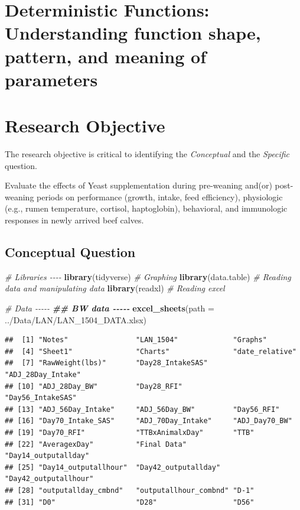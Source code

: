 \documentclass[
]{book}
\newenvironment{Shaded}{\begin{snugshade}}{\end{snugshade}}
\newcommand{\AttributeTok}[1]{\textcolor[rgb]{0.13,0.29,0.53}{#1}}
\newcommand{\CommentTok}[1]{\textcolor[rgb]{0.56,0.35,0.01}{\textit{#1}}}
\newcommand{\DocumentationTok}[1]{\textcolor[rgb]{0.56,0.35,0.01}{\textbf{\textit{#1}}}}
\newcommand{\FunctionTok}[1]{\textcolor[rgb]{0.13,0.29,0.53}{\textbf{#1}}}
\newcommand{\NormalTok}[1]{#1}
\newcommand{\StringTok}[1]{\textcolor[rgb]{0.31,0.60,0.02}{#1}}
\begin{document}
\chapter{Deterministic Functions: Understanding function shape, pattern, and meaning of parameters}\label{deterministic-functions-understanding-function-shape-pattern-and-meaning-of-parameters}

\chapter{Research Objective}\label{research-objective}

The research objective is critical to identifying the \emph{Conceptual} and the \emph{Specific} question.

Evaluate the effects of Yeast supplementation during pre-weaning and(or) post-weaning periods on performance (growth, intake, feed efficiency), physiologic (e.g., rumen temperature, cortisol, haptoglobin), behavioral, and immunologic responses in newly arrived beef calves.

\section{Conceptual Question}\label{conceptual-question}

\begin{Shaded}
\begin{Highlighting}[]
\CommentTok{\# Libraries {-}{-}{-}{-}}
\FunctionTok{library}\NormalTok{(tidyverse) }\CommentTok{\# Graphing }
\FunctionTok{library}\NormalTok{(data.table) }\CommentTok{\# Reading data and manipulating data}
\FunctionTok{library}\NormalTok{(readxl) }\CommentTok{\# Reading excel}

\CommentTok{\# Data {-}{-}{-}{-}{-}}
\DocumentationTok{\#\# BW data {-}{-}{-}{-}{-}}
\FunctionTok{excel\_sheets}\NormalTok{(}\AttributeTok{path =} \StringTok{\textquotesingle{}../Data/LAN/LAN\_1504\_DATA.xlsx\textquotesingle{}}\NormalTok{)}
\end{Highlighting}
\end{Shaded}

\begin{verbatim}
##  [1] "Notes"                "LAN_1504"             "Graphs"              
##  [4] "Sheet1"               "Charts"               "date_relative"       
##  [7] "RawWeight(lbs)"       "Day28_IntakeSAS"      "ADJ_28Day_Intake"    
## [10] "ADJ_28Day_BW"         "Day28_RFI"            "Day56_IntakeSAS"     
## [13] "ADJ_56Day_Intake"     "ADJ_56Day_BW"         "Day56_RFI"           
## [16] "Day70_Intake_SAS"     "ADJ_70Day_Intake"     "ADJ_Day70_BW"        
## [19] "Day70_RFI"            "TTBxAnimalxDay"       "TTB"                 
## [22] "AveragexDay"          "Final Data"           "Day14_outputallday"  
## [25] "Day14_outputallhour"  "Day42_outputallday"   "Day42_outputallhour" 
## [28] "outputallday_cmbnd"   "outputallhour_combnd" "D-1"                 
## [31] "D0"                   "D28"                  "D56"
\end{verbatim}
\end{document}
